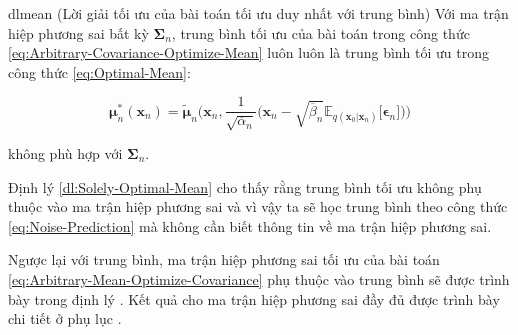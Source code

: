 \documentclass[14pt, a4paper]{article}
\numberwithin{equation}{section}
\numberwithin{figure}{section}
\numberwithin{dl}{section}
\numberwithin{md}{section}
\numberwithin{bd}{section}
\numberwithin{dn}{section}
\numberwithin{hq}{section}
\begin{document}
    \begin{restatable}{dl}{mean} \label{dl:Solely-Optimal-Mean}
        (Lời giải tối ưu của bài toán tối ưu duy nhất với trung bình)
        Với ma trận hiệp phương sai bất kỳ $\boldsymbol{\Sigma}_n$,
        trung bình tối ưu của bài toán trong công thức \ref{eq:Arbitrary-Covariance-Optimize-Mean} luôn luôn là trung bình tối ưu trong công thức \ref{eq:Optimal-Mean}:

        \begin{equation*}
            \boldsymbol{\mu}_n^{\ast} (\boldsymbol{x}_n)=\tilde{\boldsymbol{\mu}}_n \Bigg( \boldsymbol{x}_n, \dfrac{1}{\sqrt{\overline{\alpha}_n}} \Big( \boldsymbol{x}_n - \sqrt{\overline{\beta}_n} \mathbb{E}_{q(\boldsymbol{x}_0 \vert \boldsymbol{x}_n)} \lbrack \boldsymbol{\epsilon}_n \rbrack \Big) \Bigg)
        \end{equation*}

        không phù hợp với $\boldsymbol{\Sigma}_n$.
    \end{restatable}

    Định lý \ref{dl:Solely-Optimal-Mean} cho thấy rằng trung bình tối ưu không phụ thuộc vào ma trận hiệp phương sai và vì vậy ta sẽ học trung bình theo công thức \ref{eq:Noise-Prediction} mà không cần biết thông tin về ma trận hiệp phương sai.

    Ngược lại với trung bình, ma trận hiệp phương sai tối ưu của bài toán \ref{eq:Arbitrary-Mean-Optimize-Covariance} phụ thuộc vào trung bình sẽ được trình bày trong định lý .
    Kết quả cho ma trận hiệp phương sai đầy đủ được trình bày chi tiết ở phụ lục .
\end{document}
